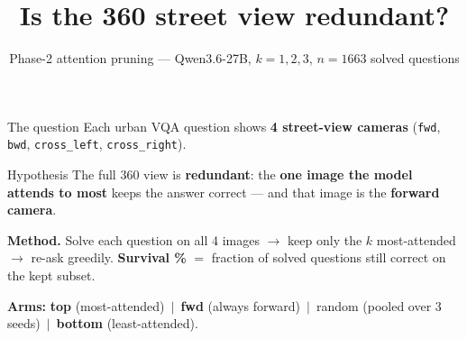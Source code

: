 \documentclass[aspectratio=169]{beamer}
\title{Is the 360\textdegree{} street view redundant?}
\subtitle{Phase-2 attention pruning --- Qwen3.6-27B, $k{=}1,2,3$, $n{=}1663$ solved questions}
\date{}\author{}
\begin{document}
\maketitle

\begin{frame}{The question}
\large
Each urban VQA question shows \textbf{4 street-view cameras}
(\texttt{fwd}, \texttt{bwd}, \texttt{cross\_left}, \texttt{cross\_right}).
\vspace{6pt}
\begin{block}{Hypothesis}
The full 360\textdegree{} view is \textbf{redundant}: the \textbf{one image the model
attends to most} keeps the answer correct --- and that image is the
\textbf{forward camera}.
\end{block}
\vspace{6pt}
\footnotesize
\textbf{Method.} Solve each question on all 4 images $\to$ keep only the $k$ most-attended
$\to$ re-ask greedily. \textbf{Survival \%} $=$ fraction of solved questions still correct
on the kept subset.
\par\vspace{3pt}
\textbf{Arms:} \textcolor{ours}{\textbf{top}} (most-attended) $\,\vert\,$
\textcolor{fwdc}{\textbf{fwd}} (always forward) $\,\vert\,$
random (pooled over 3 seeds) $\,\vert\,$
\textcolor{botc}{\textbf{bottom}} (least-attended).
\end{frame}
\end{document}
